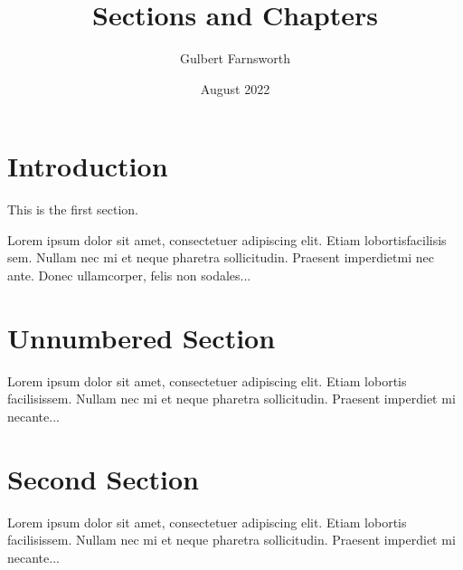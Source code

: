 \documentclass{article}
\title{Sections and Chapters}
\author{Gulbert Farnsworth}
\date{August 2022}
\begin{document}
	\maketitle
	\tableofcontents
	
	\section{Introduction}
	
	This is the first section.
	
	Lorem  ipsum  dolor  sit  amet,  consectetuer  adipiscing  
	elit.   Etiam  lobortisfacilisis sem.  Nullam nec mi et 
	neque pharetra sollicitudin.  Praesent imperdietmi nec ante. 
	Donec ullamcorper, felis non sodales...
	
	\section*{Unnumbered Section}
	
	Lorem ipsum dolor sit amet, consectetuer adipiscing elit.  
	Etiam lobortis facilisissem.  Nullam nec mi et neque pharetra 
	sollicitudin.  Praesent imperdiet mi necante...
	
	\section{Second Section}
	
	Lorem ipsum dolor sit amet, consectetuer adipiscing elit.  
	Etiam lobortis facilisissem.  Nullam nec mi et neque pharetra 
	sollicitudin.  Praesent imperdiet mi necante...
\end{document}
